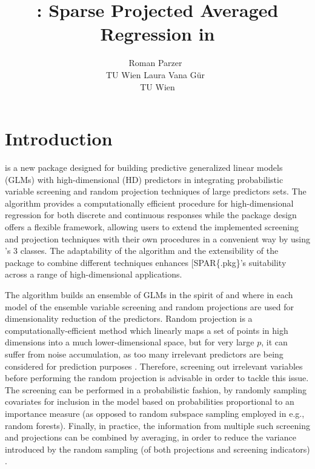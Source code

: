 \documentclass[
  article]{jss}
\author{Roman Parzer~\orcidlink{0000-0003-0893-3190}\\TU Wien \And Laura
Vana Gür~\orcidlink{0000-0002-9613-7604}\\TU Wien}
\title{\pkg{SPAR}: Sparse Projected Averaged Regression in \proglang{R}}
\begin{document}
\maketitle


\section{Introduction}\label{sec-intro}

 is a new package designed for building predictive generalized
linear models (GLMs) with high-dimensional (HD) predictors in
 integrating probabilistic variable screening and random
projection techniques of large predictors sets. The algorithm provides a
computationally efficient procedure for high-dimensional regression for
both discrete and continuous responses while the package design offers a
flexible framework, allowing users to extend the implemented screening
and projection techniques with their own procedures in a convenient way
by using 's 3 classes. The adaptability of the
algorithm and the extensibility of the package to combine different
techniques enhances {[}SPAR\{.pkg\}'s suitability across a range of
high-dimensional applications.

The algorithm builds an ensemble of GLMs in the spirit of
\citet{Dunson2020TargRandProj} and \citet{parzer2024glms} where in each
model of the ensemble variable screening and random projections are used
for dimensionality reduction of the predictors. Random projection is a
computationally-efficient method which linearly maps a set of points in
high dimensions into a much lower-dimensional space, but for very large
\(p\), it can suffer from noise accumulation, as too many irrelevant
predictors are being considered for prediction purposes
\citep{Dunson2020TargRandProj}. Therefore, screening out irrelevant
variables before performing the random projection is advisable in order
to tackle this issue. The screening can be performed in a probabilistic
fashion, by randomly sampling covariates for inclusion in the model
based on probabilities proportional to an importance measure (as opposed
to random subspace sampling employed in e.g., random forests). Finally,
in practice, the information from multiple such screening and
projections can be combined by averaging, in order to reduce the
variance introduced by the random sampling (of both projections and
screening indicators) \citep{Thanei2017RPforHDR}.
\end{document}
